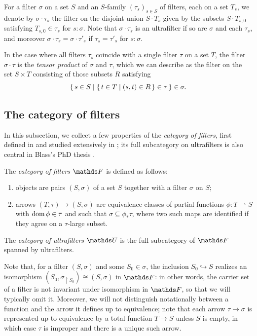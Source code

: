 \begin{cons}\label{cons:dependent-tensor-products}
    For a filter $\sigma$ on a set $S$ and an $S$-family $(\tau_s)_{s\in S}$ of filters, each on a set $T_s$, we denote by $\sigma \cdot \tau_s$ the filter on the disjoint union $S \cdot T_s$ given by the subsets $S \cdot T_{s,0}$ satisfying $T_{s,0} \in \tau_s$ for $s :\sigma$. Note that $\sigma \cdot \tau_s$ is an ultrafilter if so are $\sigma$ and each $\tau_s$, and moreover $\sigma \cdot \tau_s = \sigma \cdot \tau'_s$ if $\tau_s = \tau'_s$ for $s:\sigma$. 

    In the case where all filters $\tau_s$ coincide with a single filter $\tau$ on a set $T$, the filter $\sigma\cdot \tau$ is the \emph{tensor product} of $\sigma$ and $\tau$, which we can describe as the filter on the set $S \times T$ consisting of those subsets $R$ satisfying 
    \[ \set{ s\in S | \set{ t \in T | (s,t) \in R } \in \tau } \in \sigma. \]
\end{cons}


\subsection{The category of filters}\label{ssec:category-of-filters}In this subsection, we collect a few properties of the \emph{category of filters}, first defined in \cite{koubekCategoryFilters1970} and studied extensively in \cite{blassTwoClosedCategories1977}; its full subcategory on ultrafilters is also central in Blass's PhD thesis \cite{blassOrderingsUltrafilters1970}. 

\begin{defn}[$\FF$ and $\UF$]
    The \emph{category of filters} $\FF$ is defined as follows: 
    \begin{enumerate}
        \item objects are pairs $(S, \sigma)$ of a set $S$ together with a filter $\sigma$ on $S$;
        \item arrows $(T, \tau) \to (S, \sigma)$ are equivalence classes of partial functions $\phi \colon T \rightharpoonup S$ with $\operatorname{dom} \phi \in\tau$ and such that $\sigma \subseteq \phi_*\tau$, where two such maps are identified if they agree on a $\tau$-large subset.
    \end{enumerate}
    The \emph{category of ultrafilters} $\UF$ is the full subcategory of $\FF$ spanned by ultrafilters.
\end{defn}

Note that, for a filter $(S,\sigma)$ and some $S_0\in\sigma$, the inclusion $S_0 \hookrightarrow S$ realizes an isomorphism $(S_0,\sigma_{\upharpoonright S_0})\cong (S,\sigma)$ in $\FF$: in other words, the carrier set of a filter is not invariant under isomorphism in $\FF$, so that we will typically omit it. Moreover, we will not distinguish notationally between a function and the arrow it defines up to equivalence; note that each arrow $\tau \to \sigma$ is represented up to equivalence by a total function $T \to S$ unless $S$ is empty, in which case $\tau$ is improper and there is a unique such arrow.

